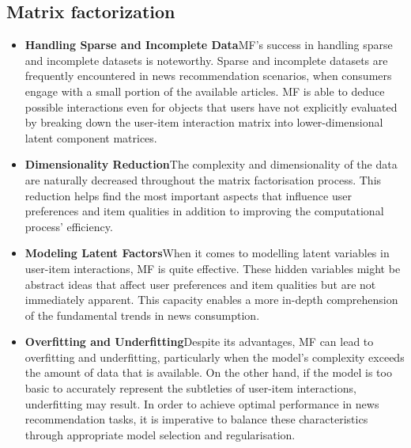 \documentclass[9pt,twocolumn,twoside,lineno]{gsajnl}
\begin{document}
\subsection{Matrix factorization}

\begin{itemize}
    \item \textbf{Handling Sparse and Incomplete Data\newline}MF's success in handling sparse and incomplete datasets is noteworthy. Sparse and incomplete datasets are frequently encountered in news recommendation scenarios, when consumers engage with a small portion of the available articles. MF is able to deduce possible interactions even for objects that users have not explicitly evaluated by breaking down the user-item interaction matrix into lower-dimensional latent component matrices.
    \item \textbf{Dimensionality Reduction\newline}The complexity and dimensionality of the data are naturally decreased throughout the matrix factorisation process. This reduction helps find the most important aspects that influence user preferences and item qualities in addition to improving the computational process' efficiency.
    
    \item \textbf{Modeling Latent Factors\newline}When it comes to modelling latent variables in user-item interactions, MF is quite effective. These hidden variables might be abstract ideas that affect user preferences and item qualities but are not immediately apparent. This capacity enables a more in-depth comprehension of the fundamental trends in news consumption.

    \item \textbf{Overfitting and Underfitting\newline}Despite its advantages, MF can lead to overfitting and underfitting, particularly when the model's complexity exceeds the amount of data that is available. On the other hand, if the model is too basic to accurately represent the subtleties of user-item interactions, underfitting may result. In order to achieve optimal performance in news recommendation tasks, it is imperative to balance these characteristics through appropriate model selection and regularisation.
\end{itemize}
\end{document}

